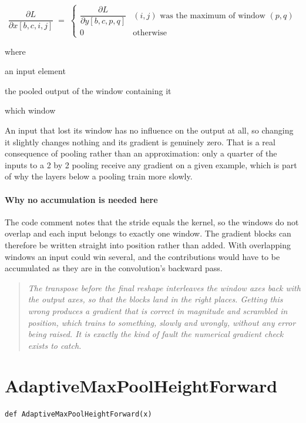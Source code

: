 \begin{equation}
\frac{\partial L}{\partial x[b,c,i,j]} \;=\; \begin{cases} \dfrac{\partial L}{\partial y[b,c,p,q]} & (i,j) \text{ was the maximum of window } (p,q) \\[6pt] 0 & \text{otherwise} \end{cases}
\end{equation}

\noindent where
\begin{description}[leftmargin=2.4em,style=nextline,font=\normalfont\ttfamily]\setlength\itemsep{1pt}
  \item[{$x[b,c,i,j]$}] \normalfont an input element
  \item[{$y[b,c,p,q]$}] \normalfont the pooled output of the window containing it
  \item[{$(p,q)$}] \normalfont which window
\end{description}
An input that lost its window has no influence on the output at all, so changing it slightly changes nothing and its gradient is genuinely zero. That is a real consequence of pooling rather than an approximation: only a quarter of the inputs to a 2 by 2 pooling receive any gradient on a given example, which is part of why the layers below a pooling train more slowly.


\paragraph{Why no accumulation is needed here}
The code comment notes that the stride equals the kernel, so the windows do not overlap and each input belongs to exactly one window. The gradient blocks can therefore be written straight into position rather than added. With overlapping windows an input could win several, and the contributions would have to be accumulated as they are in the convolution's backward pass.


\begin{quote}\small\itshape The transpose before the final reshape interleaves the window axes back with the output axes, so that the blocks land in the right places. Getting this wrong produces a gradient that is correct in magnitude and scrambled in position, which trains to something, slowly and wrongly, without any error being raised. It is exactly the kind of fault the numerical gradient check exists to catch.\end{quote}

\section{AdaptiveMaxPoolHeightForward}
\begin{lstlisting}[style=sig]
def AdaptiveMaxPoolHeightForward(x)
\end{lstlisting}

